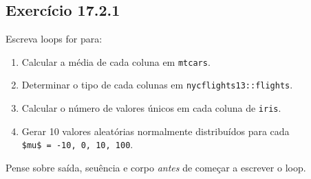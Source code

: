 \documentclass[
]{latex/krantz}
\providecommand{\tightlist}{%
  \setlength{\itemsep}{0pt}\setlength{\parskip}{0pt}}
\theoremstyle{definition}
\theoremstyle{definition}
\theoremstyle{definition}
\theoremstyle{definition}
\theoremstyle{remark}
\begin{document}
\hypertarget{exr17-2-1}{%
\subsection*{Exercício 17.2.1}\label{exr17-2-1}}

Escreva loops for para:

\begin{enumerate}
\def\labelenumi{\alph{enumi}.}
\tightlist
\item
  Calcular a média de cada coluna em \texttt{mtcars}.
\item
  Determinar o tipo de cada colunas em \texttt{nycflights13::flights}.
\item
  Calcular o número de valores únicos em cada coluna de \texttt{iris}.
\item
  Gerar 10 valores aleatórias normalmente distribuídos para cada \texttt{\$mu\$\ =\ -10,\ 0,\ 10,\ 100}.
\end{enumerate}

Pense sobre saída, seuência e corpo \emph{antes} de começar a escrever o loop.
\end{document}
